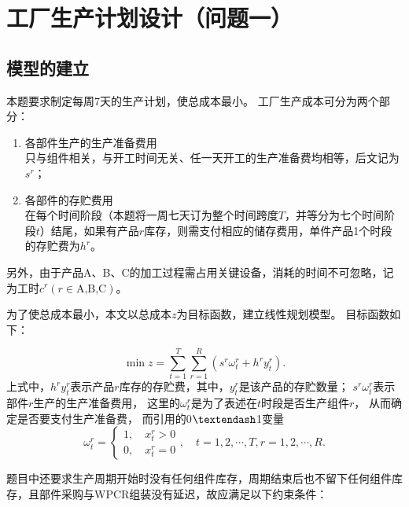 \section{工厂生产计划设计（问题一）} %
\label{sec:工厂生产计划设计_问题一_}

\subsection{模型的建立} %
\label{sub:模型的建立}

本题要求制定每周7天的生产计划，使总成本最小。
工厂生产成本可分为两个部分：
\begin{enumerate}
	\item 各部件生产的生产准备费用\\
只与组件相关，与开工时间无关、任一天开工的生产准备费均相等，后文记为$s^r$；
	\item 各部件的存贮费用\\
在每个时间阶段（本题将一周七天订为整个时间跨度$T$，并等分为七个时间阶段$t$）结尾，如果有产品$r$库存，则需支付相应的储存费用，单件产品1个时段的存贮费为$h^r$。
\end{enumerate}
另外，由于产品A、B、C的加工过程需占用关键设备，消耗的时间不可忽略，记为工时$c^r(r\in{\text{A,B,C}})$。

为了使总成本最小，本文以总成本$z$为目标函数，建立线性规划模型。
目标函数如下：

\begin{equation}
	\min z=\sum_{t=1}^{T} \sum_{r=1}^{R}\left(s^{r} \omega_{t}^{r}+h^{r} y_{t}^{r}\right).
\end{equation}
上式中，$h^{r} y_{t}^{r}$表示产品$r$库存的存贮费，其中，$y_{t}^{r}$是该产品的存贮数量；
$s^{r} \omega_{t}^{r}$表示部件$r$生产的生产准备费用，
这里的$\omega_{t}^{r}$是为了表述在$t$时段是否生产组件$r$， 从而确定是否要支付生产准备费， 而引用的0$\textendash$1变量
\begin{equation}
	\omega_{t}^{r}=\left\{\begin{array}{l}
1, \quad x_{t}^{r}>0 \\
0, \quad x_{t}^{r}=0
\end{array},\quad t=1,2, \cdots, T, r=1,2, \cdots, R.\right.
\end{equation}

题目中还要求生产周期开始时没有任何组件库存，周期结束后也不留下任何组件库存，且部件采购与WPCR组装没有延迟，故应满足以下约束条件：

